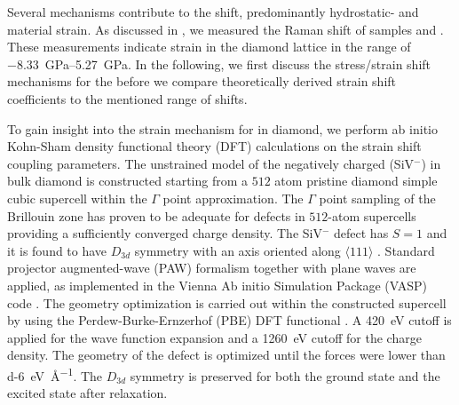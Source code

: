 	
	Several mechanisms contribute to the \cwl shift, predominantly hydrostatic- and material strain.
	As discussed in , we measured the Raman shift of samples \insituS and \implantedTao.
	These measurements indicate strain in the diamond lattice in the range of \SIrange{-8.33}{5.27}{\giga\pascal}.
	In the following, we first discuss the stress/strain shift mechanisms for the \siv before we compare theoretically derived strain shift coefficients to the mentioned range of \ZPL shifts.

	To gain insight into the strain mechanism for \sivs in diamond, we perform ab initio Kohn-Sham density functional theory (DFT) calculations on the strain \ZPL shift coupling parameters. 
	The unstrained model of the negatively charged \sivc (SiV$^{-}$) in bulk diamond is constructed starting from a $512$ atom pristine diamond simple cubic supercell within the $\Gamma$ point approximation. 
	The $\Gamma$ point sampling of the Brillouin zone has proven to be adequate for defects in $512$-atom supercells \cite{deak2014formation,kaviani2014proper} providing a sufficiently converged charge density. 
	The SiV$^{-}$ defect has $S=1$ and it is found to have $D_{3d}$ symmetry with an axis oriented along  $\langle 111 \rangle$ \cite{Goss2007}. 
	Standard projector augmented-wave (PAW) formalism together with plane waves are applied, as implemented in the Vienna Ab initio Simulation Package (VASP) code \cite{kresse1993ab,kresse1996efficiency,kresse1996efficient,kresse1999ultrasoft}. The geometry optimization is carried out within the constructed supercell by using the Perdew-Burke-Ernzerhof (PBE) DFT functional \cite{perdew1996generalized}. A \SI{420}{\eV} cutoff is applied for the wave function expansion and a \SI{1260}{\eV} cutoff for the charge density. The geometry of the defect is optimized until the forces were lower than \SI{d-6}{\eV\per\angstrom}. The $D_{3d}$ symmetry is preserved for both the ground state and the excited state after relaxation.


